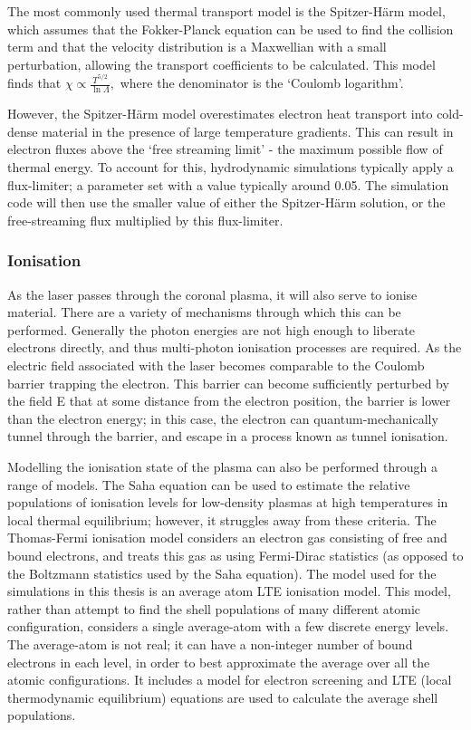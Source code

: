 The most commonly used thermal transport model is the Spitzer-H{\"a}rm model, which assumes that the Fokker-Planck equation can be used to find the collision term and that the velocity distribution is a Maxwellian with a small perturbation, allowing the transport coefficients to be calculated. This model finds that $\chi \propto \frac{T^{5/2}}{\ln{\Lambda}},$ where the denominator is the `Coulomb logarithm'.

However, the Spitzer-H{\"a}rm model overestimates electron heat transport into cold-dense material in the  presence of large temperature gradients. This can result in electron fluxes above the `free streaming limit'  - the maximum possible flow of thermal energy. To account for this, hydrodynamic simulations typically apply a flux-limiter; a parameter set with a value typically around 0.05. The simulation code will then use the smaller value of either the Spitzer-H{\"a}rm solution, or the free-streaming flux multiplied by this flux-limiter.

\subsubsection{Ionisation}
As the laser passes through the coronal plasma, it will also serve to ionise material. There are a variety of mechanisms through which this can be performed. Generally the photon energies are not high enough to liberate electrons directly, and thus multi-photon ionisation processes are required. As the electric field associated with the laser becomes comparable to the Coulomb barrier trapping the electron. This barrier can become sufficiently perturbed by the field E that at some distance from the electron position, the barrier is lower than the electron energy; in this case, the electron can quantum-mechanically tunnel through the barrier, and escape in a process known as tunnel ionisation.

Modelling the ionisation state of the plasma can also be performed through a range of models. The Saha equation can be used to estimate the relative populations of ionisation levels for low-density plasmas at high temperatures in local thermal equilibrium; however, it struggles away from these criteria. The Thomas-Fermi ionisation model considers an electron gas consisting of free and bound electrons, and treats this gas as using Fermi-Dirac statistics (as opposed to the Boltzmann statistics used by the Saha equation). The model used for the simulations in this thesis is an average atom LTE ionisation model. This model, rather than attempt to find the shell populations of many different atomic configuration, considers a single average-atom with a few discrete energy levels. The average-atom is not real; it can have a non-integer number of bound electrons in each level, in order to best approximate the average over all the atomic configurations. It includes a model for electron screening and LTE (local thermodynamic equilibrium) equations are used to calculate the average shell populations. 

